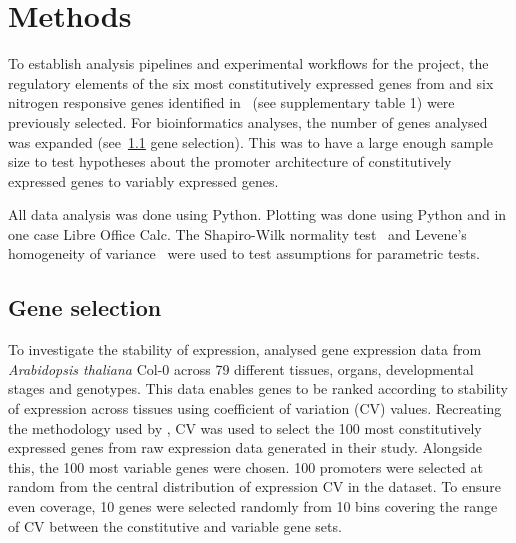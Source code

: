 \section{Methods}\label{methods}

To establish analysis pipelines and experimental workflows for the project, the regulatory elements of the six most constitutively expressed genes from \textcite*{czechowskiGenomeWideIdentificationTesting2005} and six nitrogen responsive genes identified in~\textcite*{gaudinierTranscriptionalRegulationNitrogenassociated2018} (see supplementary table 1) were previously selected.
For bioinformatics analyses, the number of genes analysed was expanded (see~\ref{gene-selection} gene selection).
This was to have a large enough sample size to test hypotheses about the promoter architecture of constitutively expressed genes to variably expressed genes.

All data analysis was done using Python. Plotting was done using Python
and in one case Libre Office Calc. The Shapiro\hyp{}Wilk normality
test~\autocite{shapiroAnalysisVarianceTest1965} and Levene's homogeneity of variance~\autocite{leveneRobustTestsEquality1960} were used to test assumptions for parametric tests.

\subsection{Gene selection}\label{gene-selection}

To investigate the stability of expression, \textcite*{czechowskiGenomeWideIdentificationTesting2005} analysed gene expression data from \textit{Arabidopsis thaliana} Col-0 across 79 different tissues,
organs, developmental stages and genotypes. This data enables genes to
be ranked according to stability of expression across tissues using
coefficient of variation (CV) values. Recreating the methodology used by \textcite*{czechowskiGenomeWideIdentificationTesting2005}, CV was used to select
the 100 most constitutively expressed genes from raw expression data
generated in their study. Alongside this, the 100 most variable genes
were chosen. 100 promoters were selected at random from the central
distribution of expression CV in the \textcite*{czechowskiGenomeWideIdentificationTesting2005} dataset. To ensure even coverage, 10 genes were
selected randomly from 10 bins covering the range of CV between the
constitutive and variable gene sets.


